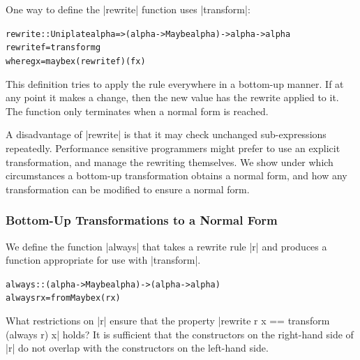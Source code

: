 \documentclass[preprint]{sigplanconf}
\newenvironment{code}{\begin{alltt}\small}{\end{alltt}}
\newcommand{\ignore}{}
\begin{document}
One way to define the |rewrite| function uses |transform|:

\begin{code}
rewrite :: Uniplate alpha => (alpha -> Maybe alpha) -> alpha -> alpha
rewrite f = transform g
    where g x = maybe x (rewrite f) (f x)
\end{code}

This definition tries to apply the rule everywhere in a bottom-up manner. If at any point it makes a change, then the new value has the rewrite applied to it. The function only terminates when a normal form is reached.

A disadvantage of |rewrite| is that it may check unchanged sub-expressions repeatedly. Performance sensitive programmers might prefer to use an explicit transformation, and manage the rewriting themselves. We show under which circumstances a bottom-up transformation obtains a normal form, and how any transformation can be modified to ensure a normal form.

\subsubsection{Bottom-Up Transformations to a Normal Form}
\label{sec:rewrite_bottom}

We define the function |always| that takes a rewrite rule |r| and produces a function appropriate for use with |transform|.

\begin{code}
always :: (alpha -> Maybe alpha) -> (alpha -> alpha)
always r x = fromMaybe x (r x)
\end{code}

What restrictions on |r| ensure that the property \ignore|rewrite r x == transform (always r) x| holds? It is sufficient that the constructors on the right-hand side of |r| do not overlap with the constructors on the left-hand side.
\end{document}
